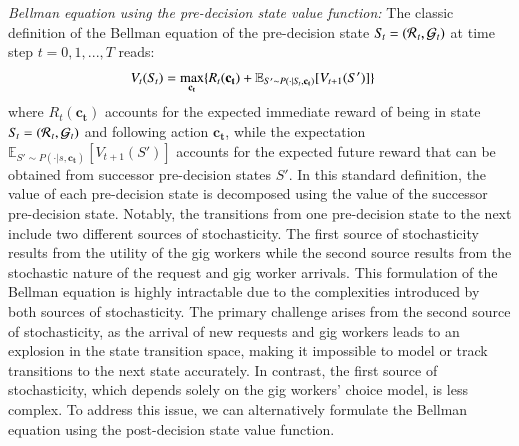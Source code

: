 \noindent \textit{Bellman equation using the pre-decision state value function:}
The classic definition of the Bellman equation of the pre-decision state $S\hspace{-0.1em}_t = (\mathcal{R}\hspace{0.05em}_{t},\mathcal{G}_t)$ at time step $t = 0,1,...,T$ reads: 
\begin{align}
V_t(S\hspace{-0.1em}_t) & = \max_{\mathbf{c_t}} \{  R_t(\mathbf{c_t}) + \mathbb{E}_{S' \sim P(\cdot|S\hspace{-0.1em}_t,\mathbf{c_t})}[V_{t+1}(S')] \}
\end{align}
where $R_t(\mathbf{c_t})$ accounts for the expected immediate reward of being in state $S\hspace{-0.1em}_t = (\mathcal{R}\hspace{0.05em}_{t},\mathcal{G}_t)$ and following action $\mathbf{c_t}$, while the expectation $\mathbb{E}_{S' \sim P(\cdot|s,\mathbf{c_t})}[V_{t+1}(S')]$ accounts for the expected future reward that can be obtained from successor pre-decision states $S'$. In this standard definition, the value of each pre-decision state is decomposed using the value of the successor pre-decision state. Notably, the transitions from one pre-decision state to the next include two different sources of stochasticity. The first source of stochasticity results from the utility of the gig workers while the second source results from the stochastic nature of the request and gig worker arrivals. 
This formulation of the Bellman equation is highly intractable due to the complexities introduced by both sources of stochasticity. The primary challenge arises from the second source of stochasticity, as the arrival of new requests and gig workers leads to an explosion in the state transition space, making it impossible to model or track transitions to the next state accurately. In contrast, the first source of stochasticity, which depends solely on the gig workers' choice model, is less complex. To address this issue, we can alternatively formulate the Bellman equation using the post-decision state value function.

